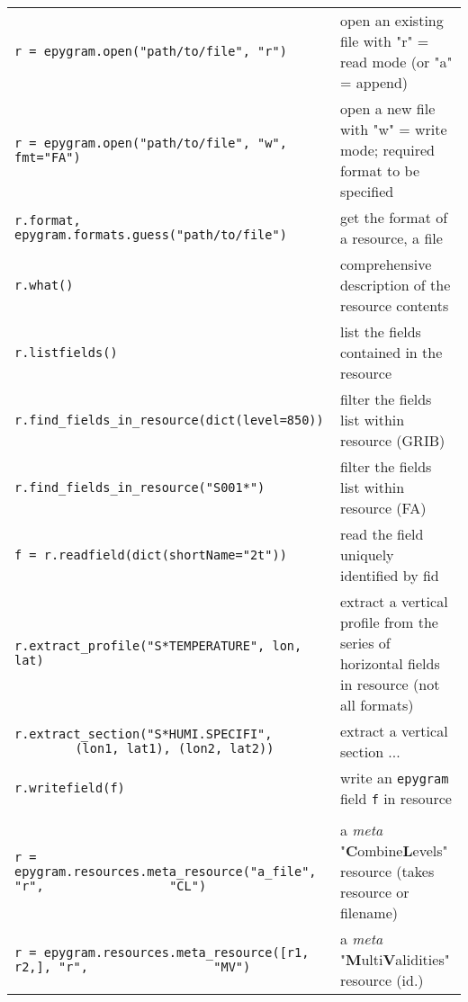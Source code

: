 \documentclass[a4paper,10pt]{article}
\begin{document}
\begin{tabular}{|p{9.5cm}|p{9.5cm}|}
\hline
\rowcolor{gray!50}
\multicolumn{2}{|c|}{\textbf{Resources}}\\
\hline
\texttt{r = epygram.open("path/to/file", "r")} & open an existing file with "r" = read mode (or "a" = append)\\
\texttt{r = epygram.open("path/to/file", "w", fmt="FA")} & open a new file with "w" = write mode; required format to be specified\\
\texttt{r.format, epygram.formats.guess("path/to/file")} & get the format of a resource, a file\\
\texttt{r.what()} & comprehensive description of the resource contents\\
\texttt{r.listfields()} & list the fields contained in the resource\\
\texttt{r.find\_fields\_in\_resource(dict(level=850))} & filter the fields list within resource (GRIB)\\
\texttt{r.find\_fields\_in\_resource("S001*")} & filter the fields list within resource (FA)\\
\texttt{f = r.readfield(dict(shortName="2t"))} & read the field uniquely identified by fid\\
\texttt{r.extract\_profile("S*TEMPERATURE", lon, lat)} & extract a vertical profile from the series of horizontal fields in resource (not all formats)\\
\texttt{r.extract\_section("S*HUMI.SPECIFI",
$~~~~~~~~~~~~~~~~~~~$(lon1, lat1), (lon2, lat2))} & extract a vertical section ...\\
\texttt{r.writefield(f)} & write an \texttt{epygram} field \texttt{f} in resource\\
\hline

\rowcolor{gray!50}
\multicolumn{2}{|c|}{\textbf{Meta-Resources}}\\
\hline
\texttt{r = epygram.resources.meta\_resource("a\_file", "r",
$~~~~~~~~~~~~~~~~~~~~~~~~~~~~~~~~~~~~~$"CL")} & a \textit{meta} "\textbf{C}ombine\textbf{L}evels" resource (takes resource or filename)\\
\texttt{r = epygram.resources.meta\_resource([r1, r2,], "r",
$~~~~~~~~~~~~~~~~~~~~~~~~~~~~~~~~~~~~~$"MV")}& a \textit{meta} "\textbf{M}ulti\textbf{V}alidities" resource (id.)\\
\hline
\end{tabular}\\
\\
\end{document}
